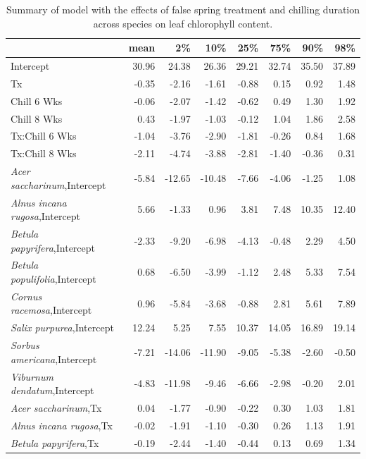 \documentclass{article}\usepackage[]{graphicx}\usepackage[]{color}
\begin{document}
\newpage
\begin{longtable}{lrrrrrrr}
\caption{Summary of model with the effects of false spring treatment and chilling duration across species on leaf chlorophyll content.} \\ 
  \hline
 & mean & 2\% & 10\% & 25\% & 75\% & 90\% & 98\% \\ 
  \hline \endhead  \hline
Intercept & 30.96 & 24.38 & 26.36 & 29.21 & 32.74 & 35.50 & 37.89 \\ 
  Tx & -0.35 & -2.16 & -1.61 & -0.88 & 0.15 & 0.92 & 1.48 \\ 
  Chill 6 Wks & -0.06 & -2.07 & -1.42 & -0.62 & 0.49 & 1.30 & 1.92 \\ 
  Chill 8 Wks & 0.43 & -1.97 & -1.03 & -0.12 & 1.04 & 1.86 & 2.58 \\ 
  Tx:Chill 6 Wks & -1.04 & -3.76 & -2.90 & -1.81 & -0.26 & 0.84 & 1.68 \\ 
  Tx:Chill 8 Wks & -2.11 & -4.74 & -3.88 & -2.81 & -1.40 & -0.36 & 0.31 \\ 
  \textit{Acer saccharinum},Intercept & -5.84 & -12.65 & -10.48 & -7.66 & -4.06 & -1.25 & 1.08 \\ 
  \textit{Alnus incana rugosa},Intercept & 5.66 & -1.33 & 0.96 & 3.81 & 7.48 & 10.35 & 12.40 \\ 
  \textit{Betula papyrifera},Intercept & -2.33 & -9.20 & -6.98 & -4.13 & -0.48 & 2.29 & 4.50 \\ 
  \textit{Betula populifolia},Intercept & 0.68 & -6.50 & -3.99 & -1.12 & 2.48 & 5.33 & 7.54 \\ 
  \textit{Cornus racemosa},Intercept & 0.96 & -5.84 & -3.68 & -0.88 & 2.81 & 5.61 & 7.89 \\ 
  \textit{Salix purpurea},Intercept & 12.24 & 5.25 & 7.55 & 10.37 & 14.05 & 16.89 & 19.14 \\ 
  \textit{Sorbus americana},Intercept & -7.21 & -14.06 & -11.90 & -9.05 & -5.38 & -2.60 & -0.50 \\ 
  \textit{Viburnum dendatum},Intercept & -4.83 & -11.98 & -9.46 & -6.66 & -2.98 & -0.20 & 2.01 \\ 
  \textit{Acer saccharinum},Tx & 0.04 & -1.77 & -0.90 & -0.22 & 0.30 & 1.03 & 1.81 \\ 
  \textit{Alnus incana rugosa},Tx & -0.02 & -1.91 & -1.10 & -0.30 & 0.26 & 1.13 & 1.91 \\ 
  \textit{Betula papyrifera},Tx & -0.19 & -2.44 & -1.40 & -0.44 & 0.13 & 0.69 & 1.34 \\ 

\end{longtable}
\end{document}
